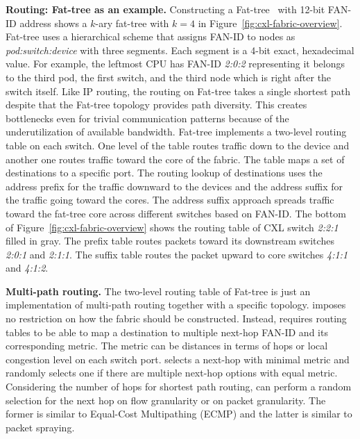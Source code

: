 \noindent \textbf{Routing: Fat-tree as an example.}
%
Constructing a Fat-tree~\cite{fat-tree:sigcomm:2008} with 12-bit FAN-ID address shows a $k$-ary fat-tree with $k=4$ in Figure~\ref{fig:cxl-fabric-overview}.
%
Fat-tree uses a hierarchical scheme that assigns FAN-ID to nodes as \emph{pod:switch:device} with three segments.
%
Each segment is a 4-bit exact, hexadecimal value.  
%
For example, the leftmost CPU has FAN-ID \emph{2:0:2} representing it belongs to the third pod, the first switch, and the third node which is right after the switch itself.
%
Like IP routing, the routing on Fat-tree takes a single shortest path despite that the Fat-tree topology provides path diversity.
%
This creates bottlenecks even for trivial communication patterns because of the underutilization of available bandwidth.
%
Fat-tree implements a two-level routing table on each switch. One level of the table routes traffic down to the device and another one routes traffic toward the core of the fabric.
%
The table maps a set of destinations to a specific port. The routing lookup of destinations uses the address prefix for the traffic downward to the devices and the address suffix for the traffic going toward the cores.
%
The address suffix approach spreads traffic toward the fat-tree core across different switches based on FAN-ID.
%
The bottom of Figure~\ref{fig:cxl-fabric-overview} shows the routing table of CXL switch \emph{2:2:1} filled in gray. The prefix table routes packets toward its downstream switches \emph{2:0:1} and \emph{2:1:1}. The suffix table routes the packet upward to core switches \emph{4:1:1} and \emph{4:1:2}.  


\noindent \textbf{Multi-path routing.}
%
The two-level routing table of Fat-tree is just an implementation of multi-path routing together with a specific topology. \aurelia imposes no restriction on how the fabric should be constructed. Instead, \aurelia requires routing tables to be able to map a destination to multiple next-hop FAN-ID and its corresponding metric. The metric can be distances in terms of hops or local congestion level on each switch port. 
%
\aurelia selects a next-hop with minimal metric and randomly selects one if there are multiple next-hop options with equal metric.  
%
Considering the number of hops for shortest path routing, \aurelia can perform a random selection for the next hop on flow granularity or on packet granularity. The former is similar to Equal-Cost Multipathing (ECMP) and the latter is similar to packet spraying. 
%

